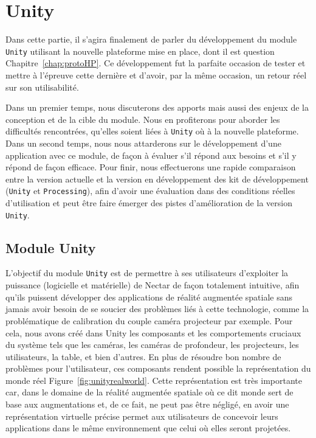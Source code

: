 \chapter{Unity}
\label{chap:unity}

Dans cette partie, il s'agira finalement de parler du développement du module \texttt{Unity} utilisant la nouvelle plateforme mise en place, dont il est question Chapitre~\ref{chap:protoHP}. Ce développement fut la parfaite occasion de tester et mettre à l'épreuve cette dernière et d'avoir, par la même occasion, un retour réel sur son utilisabilité. 

Dans un premier temps, nous discuterons des apports mais aussi des enjeux de la conception et de la cible du module. Nous en profiterons pour aborder les difficultés rencontrées, qu'elles soient liées à \texttt{Unity} où à la nouvelle plateforme. Dans un second temps, nous nous attarderons sur le développement d'une application avec ce module, de façon à évaluer s'il répond aux besoins et s'il y répond de façon efficace. Pour finir, nous effectuerons une rapide comparaison entre la version actuelle et la version en développement des kit de développement (\texttt{Unity} et \texttt{Processing}), afin d'avoir une évaluation dans des conditions réelles d'utilisation et peut être faire émerger des pistes d'amélioration de la version \texttt{Unity}.

\section{Module Unity}

L'objectif du module \texttt{Unity} est de permettre à ses utilisateurs d'exploiter la puissance (logicielle et matérielle) de Nectar de façon totalement intuitive, afin qu'ils puissent développer des applications de réalité augmentée spatiale sans jamais avoir besoin de se soucier des problèmes liés à cette technologie, comme la problématique de calibration du couple caméra projecteur par exemple.
Pour cela, nous avons créé dans Unity les composants et les comportements cruciaux du système tels que les caméras, les caméras de profondeur, les projecteurs, les utilisateurs, la table, et bien d'autres. En plus de résoudre bon nombre de problèmes pour l'utilisateur, ces composants rendent possible la représentation du monde réel Figure~\ref{fig:unityrealworld}. Cette représentation est très importante car, dans le domaine de la réalité augmentée spatiale où ce dit monde sert de base aux augmentations et, de ce fait, ne peut pas être négligé, en avoir une représentation virtuelle précise permet aux utilisateurs de concevoir leurs applications dans le même environnement que celui où elles seront projetées.


